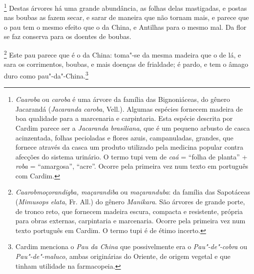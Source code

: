 \footnote{ \textit{Caaroba} ou \textit{caroba} é
uma árvore da família das Bignoniáceas, do gênero Jacarandá
(\textit{Jacaranda caroba}, Vell.). Algumas espécies fornecem madeira
de boa qualidade para a marcenaria e carpintaria. Esta espécie descrita
por Cardim parece ser a \textit{Jacaranda brasiliana}, que é um pequeno
arbusto de casca acinzentada, folhas pecioladas e flores azuis,
campanuladas, grandes, que fornece através da casca um produto
utilizado pela medicina popular contra afecções do sistema urinário. O
termo tupi vem de \textit{caá} = ``folha de planta'' + \textit{roba} = ``amargosa'', 
``acre''. Ocorre pela primeira vez num texto em português com
Cardim.} Destas árvores há uma grande abundância, as folhas
delas mastigadas, e postas nas boubas as fazem secar, e sarar de
maneira que não tornam mais, e parece que o pau tem o mesmo efeito que
o da China, e Antilhas para o mesmo mal. Da flor se faz conserva para
os doentes de boubas.

\footnote{ \textit{Caarobmoçorandigba,
maçarandiba} ou \textit{maçaranduba}: da família das Sapotáceas
(\textit{Mimusops elata}, Fr. All.) do gênero \textit{Manikara}. São
árvores de grande porte, de tronco reto, que fornecem madeira escura,
compacta e resistente, própria para obras externas, carpintaria e
marcenaria. Ocorre pela primeira vez num texto português em Cardim. O
termo tupi é de étimo incerto.} Este pau parece
que é o da China: toma"-se da mesma madeira que o de lá, e sara os
corrimentos, boubas, e mais doenças de frialdade; é pardo, e tem o
âmago duro como pau"-da"-China.\footnote{ Cardim menciona o \textit{Pau
da China} que possivelmente era o \textit{Pau"-de"-cobra} ou
\textit{Pau"-de"-maluco}, ambas originárias do Oriente, de origem vegetal
e que tinham utilidade na farmacopeia.} 

